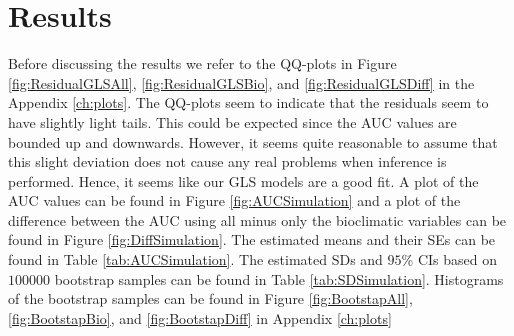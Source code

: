 \section{Results}
Before discussing the results we refer to the QQ-plots in Figure \ref{fig:ResidualGLSAll}, \ref{fig:ResidualGLSBio}, and \ref{fig:ResidualGLSDiff} in the Appendix \ref{ch:plots}. The QQ-plots seem to indicate that the residuals seem to have slightly light tails. This could be expected since the AUC values are bounded up and downwards. However, it seems quite reasonable to assume that this slight deviation does not cause any real problems when inference is performed. Hence, it seems like our GLS models are a good fit. A plot of the AUC values can be found in Figure \ref{fig:AUCSimulation} and a plot of the difference between the AUC using all minus only the bioclimatic variables can be found in Figure \ref{fig:DiffSimulation}. The estimated means and their SEs can be found in Table \ref{tab:AUCSimulation}. The estimated SDs and $95$\% CIs based on $100000$ bootstrap samples can be found in Table \ref{tab:SDSimulation}. Histograms of the bootstrap samples can be found in Figure \ref{fig:BootstapAll}, \ref{fig:BootstapBio}, and \ref{fig:BootstapDiff} in Appendix \ref{ch:plots}\\


